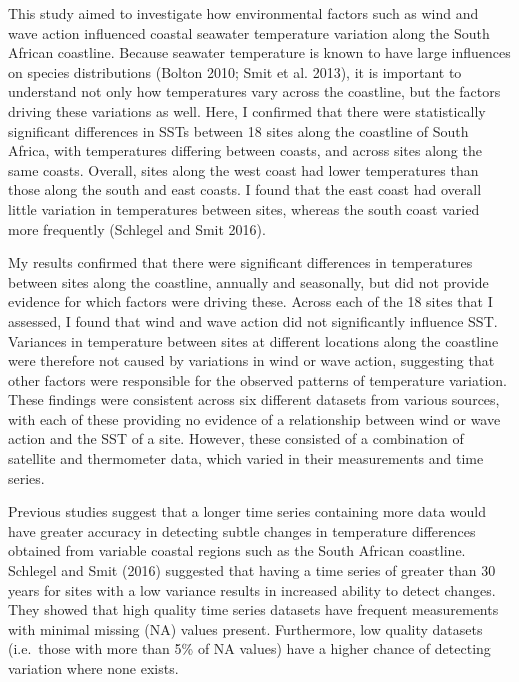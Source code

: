 \documentclass[12pt,]{article}
\begin{document}
This study aimed to investigate how environmental factors such as wind
and wave action influenced coastal seawater temperature variation along
the South African coastline. Because seawater temperature is known to
have large influences on species distributions (Bolton 2010; Smit et al.
2013), it is important to understand not only how temperatures vary
across the coastline, but the factors driving these variations as well.
Here, I confirmed that there were statistically significant differences
in SSTs between 18 sites along the coastline of South Africa, with
temperatures differing between coasts, and across sites along the same
coasts. Overall, sites along the west coast had lower temperatures than
those along the south and east coasts. I found that the east coast had
overall little variation in temperatures between sites, whereas the
south coast varied more frequently (Schlegel and Smit 2016).

My results confirmed that there were significant differences in
temperatures between sites along the coastline, annually and seasonally,
but did not provide evidence for which factors were driving these.
Across each of the 18 sites that I assessed, I found that wind and wave
action did not significantly influence SST. Variances in temperature
between sites at different locations along the coastline were therefore
not caused by variations in wind or wave action, suggesting that other
factors were responsible for the observed patterns of temperature
variation. These findings were consistent across six different datasets
from various sources, with each of these providing no evidence of a
relationship between wind or wave action and the SST of a site. However,
these consisted of a combination of satellite and thermometer data,
which varied in their measurements and time series.

Previous studies suggest that a longer time series containing more data
would have greater accuracy in detecting subtle changes in temperature
differences obtained from variable coastal regions such as the South
African coastline. Schlegel and Smit (2016) suggested that having a time
series of greater than 30 years for sites with a low variance results in
increased ability to detect changes. They showed that high quality time
series datasets have frequent measurements with minimal missing (NA)
values present. Furthermore, low quality datasets (i.e.~those with more
than 5\% of NA values) have a higher chance of detecting variation where
none exists.
\end{document}
